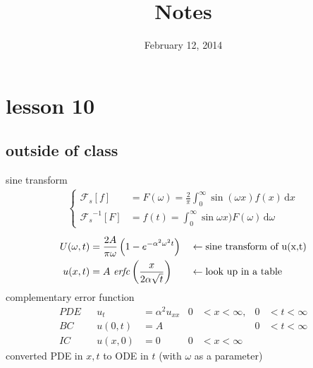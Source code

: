 \documentclass{article}
\begin{document}
\title{Notes}
\date{February 12, 2014}
\maketitle
\section*{lesson 10}
\subsection*{outside of class}
sine transform
\begin{align*}
  \left\{
  \begin{aligned}
    \mathcal{F}_s[f]&=F(\omega )=\frac{2}{\pi }\int_0^\infty{\sin(\omega x)f(x)\,\mathrm{d}x}\\
    {\mathcal{F}_s}^{-1}[F]&=f(t)=\int_0^\infty{\sin \omega x)F(\omega )\,\mathrm{d}\omega }
  \end{aligned}
  \right.
\end{align*}
\begin{align*}
  U(\omega ,t)&=\frac{2A}{\pi \omega }\left(1-e^{-\alpha^2\omega^2t}\right)&&\gets\text{sine transform of u(x,t)}\\
  u(x,t)&=A \text{ \emph{erfc}}\left(\frac{x}{2\alpha \sqrt{t}}\right)&&\gets\text{look up in a table}
\end{align*}
complementary error function
\begin{align*}
  PDE&&u_t&=\alpha ^2u_{xx}&0&<x<\infty,&0&<t<\infty\\
  BC&&u(0,t)&=A&&&0&<t<\infty\\
  IC&&u(x,0)&=0&0&<x<\infty
\end{align*}
converted PDE in $x,t$ to ODE in $t$ (with $\omega $ as a parameter)
\end{document}
